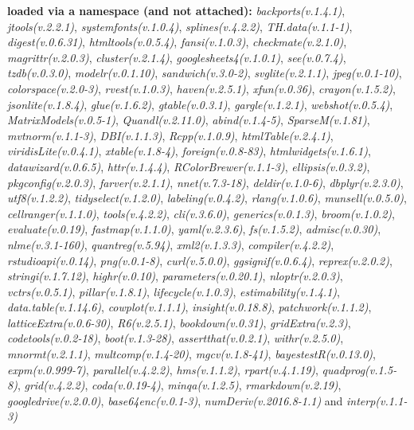 \documentclass[
  bookmarksnumbered]{article}
\begin{document}
\textbf{loaded via a namespace (and not attached):}
\emph{backports(v.1.4.1)}, \emph{jtools(v.2.2.1)}, \emph{systemfonts(v.1.0.4)}, \emph{splines(v.4.2.2)}, \emph{TH.data(v.1.1-1)}, \emph{digest(v.0.6.31)}, \emph{htmltools(v.0.5.4)}, \emph{fansi(v.1.0.3)}, \emph{checkmate(v.2.1.0)}, \emph{magrittr(v.2.0.3)}, \emph{cluster(v.2.1.4)}, \emph{googlesheets4(v.1.0.1)}, \emph{see(v.0.7.4)}, \emph{tzdb(v.0.3.0)}, \emph{modelr(v.0.1.10)}, \emph{sandwich(v.3.0-2)}, \emph{svglite(v.2.1.1)}, \emph{jpeg(v.0.1-10)}, \emph{colorspace(v.2.0-3)}, \emph{rvest(v.1.0.3)}, \emph{haven(v.2.5.1)}, \emph{xfun(v.0.36)}, \emph{crayon(v.1.5.2)}, \emph{jsonlite(v.1.8.4)}, \emph{glue(v.1.6.2)}, \emph{gtable(v.0.3.1)}, \emph{gargle(v.1.2.1)}, \emph{webshot(v.0.5.4)}, \emph{MatrixModels(v.0.5-1)}, \emph{Quandl(v.2.11.0)}, \emph{abind(v.1.4-5)}, \emph{SparseM(v.1.81)}, \emph{mvtnorm(v.1.1-3)}, \emph{DBI(v.1.1.3)}, \emph{Rcpp(v.1.0.9)}, \emph{htmlTable(v.2.4.1)}, \emph{viridisLite(v.0.4.1)}, \emph{xtable(v.1.8-4)}, \emph{foreign(v.0.8-83)}, \emph{htmlwidgets(v.1.6.1)}, \emph{datawizard(v.0.6.5)}, \emph{httr(v.1.4.4)}, \emph{RColorBrewer(v.1.1-3)}, \emph{ellipsis(v.0.3.2)}, \emph{pkgconfig(v.2.0.3)}, \emph{farver(v.2.1.1)}, \emph{nnet(v.7.3-18)}, \emph{deldir(v.1.0-6)}, \emph{dbplyr(v.2.3.0)}, \emph{utf8(v.1.2.2)}, \emph{tidyselect(v.1.2.0)}, \emph{labeling(v.0.4.2)}, \emph{rlang(v.1.0.6)}, \emph{munsell(v.0.5.0)}, \emph{cellranger(v.1.1.0)}, \emph{tools(v.4.2.2)}, \emph{cli(v.3.6.0)}, \emph{generics(v.0.1.3)}, \emph{broom(v.1.0.2)}, \emph{evaluate(v.0.19)}, \emph{fastmap(v.1.1.0)}, \emph{yaml(v.2.3.6)}, \emph{fs(v.1.5.2)}, \emph{admisc(v.0.30)}, \emph{nlme(v.3.1-160)}, \emph{quantreg(v.5.94)}, \emph{xml2(v.1.3.3)}, \emph{compiler(v.4.2.2)}, \emph{rstudioapi(v.0.14)}, \emph{png(v.0.1-8)}, \emph{curl(v.5.0.0)}, \emph{ggsignif(v.0.6.4)}, \emph{reprex(v.2.0.2)}, \emph{stringi(v.1.7.12)}, \emph{highr(v.0.10)}, \emph{parameters(v.0.20.1)}, \emph{nloptr(v.2.0.3)}, \emph{vctrs(v.0.5.1)}, \emph{pillar(v.1.8.1)}, \emph{lifecycle(v.1.0.3)}, \emph{estimability(v.1.4.1)}, \emph{data.table(v.1.14.6)}, \emph{cowplot(v.1.1.1)}, \emph{insight(v.0.18.8)}, \emph{patchwork(v.1.1.2)}, \emph{latticeExtra(v.0.6-30)}, \emph{R6(v.2.5.1)}, \emph{bookdown(v.0.31)}, \emph{gridExtra(v.2.3)}, \emph{codetools(v.0.2-18)}, \emph{boot(v.1.3-28)}, \emph{assertthat(v.0.2.1)}, \emph{withr(v.2.5.0)}, \emph{mnormt(v.2.1.1)}, \emph{multcomp(v.1.4-20)}, \emph{mgcv(v.1.8-41)}, \emph{bayestestR(v.0.13.0)}, \emph{expm(v.0.999-7)}, \emph{parallel(v.4.2.2)}, \emph{hms(v.1.1.2)}, \emph{rpart(v.4.1.19)}, \emph{quadprog(v.1.5-8)}, \emph{grid(v.4.2.2)}, \emph{coda(v.0.19-4)}, \emph{minqa(v.1.2.5)}, \emph{rmarkdown(v.2.19)}, \emph{googledrive(v.2.0.0)}, \emph{base64enc(v.0.1-3)}, \emph{numDeriv(v.2016.8-1.1)} and \emph{interp(v.1.1-3)}
\end{document}
